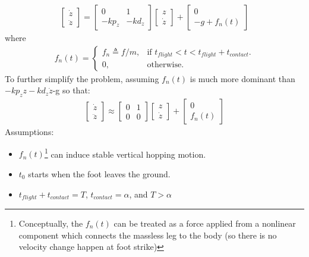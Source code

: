 \begin{align}
\begin{bmatrix}
\dot z  \\
\ddot z 
\end{bmatrix} = \begin{bmatrix}
0 & 1 \\
-kp_z & -kd_z
\end{bmatrix}\begin{bmatrix}
 z  \\
\dot z 
\end{bmatrix} + 
\begin{bmatrix}
0  \\
-g+f_n(t)
\end{bmatrix}
\end{align}
where 
\begin{align}
 f_n(t)=\begin{cases}
    f_n\triangleq f/m, & \text{if $t_{flight}<t<t_{flight}+t_{contact}$}.\\
    0, & \text{otherwise}.
  \end{cases}
\end{align}
To further simplify the problem, assuming $f_n(t)$ is much more dominant than $-kp_zz-kd_z\dot z$-g so that:
\begin{align}
\label{eq:SimpleHopper}
\begin{bmatrix}
\dot z  \\
\ddot z 
\end{bmatrix} \approx \begin{bmatrix}
0 & 1 \\
0 & 0
\end{bmatrix}\begin{bmatrix}
 z  \\
\dot z 
\end{bmatrix} + 
\begin{bmatrix}
0  \\
f_n(t)
\end{bmatrix}
\end{align}
Assumptions:
\begin{itemize}
\item $f_n(t)$\footnote{Conceptually, the $f_n(t)$ can be treated as a force applied from a nonlinear component which connects the massless leg to the body (so there is no velocity change happen at foot strike)} can induce stable vertical hopping motion.
\item $t_0$ starts when the foot leaves the ground.
\item $t_{flight} + t_{contact} = T$, $t_{contact} = \alpha$, and $T>\alpha$
\end{itemize}

